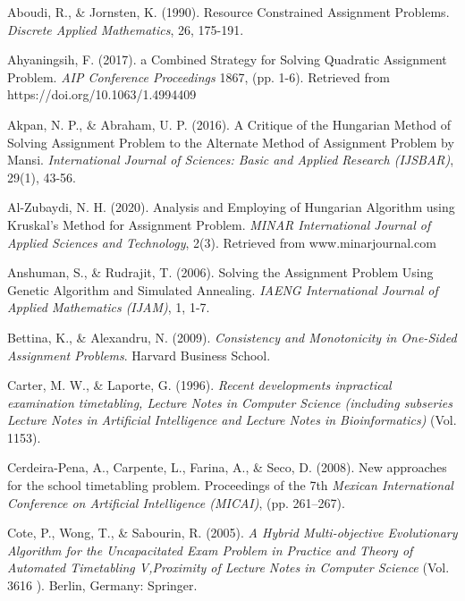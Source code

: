 \documentclass[11pt]{report}
\begin{document}
	\begin{description}
		\item Aboudi, R., \& Jornsten, K. (1990). Resource Constrained Assignment Problems. \emph{Discrete Applied Mathematics}, 26, 175-191.
		
		\item Ahyaningsih, F. (2017). a Combined Strategy for Solving Quadratic Assignment Problem. \emph{AIP
		Conference Proceedings} 1867, (pp. 1-6). Retrieved from https://doi.org/10.1063/1.4994409
		
		\item Akpan, N. P., \& Abraham, U. P. (2016). A Critique of the Hungarian Method of Solving
		Assignment Problem to the Alternate Method of Assignment Problem by Mansi. \emph{International Journal of Sciences: Basic and Applied Research (IJSBAR)}, 29(1), 43-56.
		
		\item Al-Zubaydi, N. H. (2020). Analysis and Employing of Hungarian Algorithm using Kruskal's
		Method for Assignment Problem. \emph{MINAR International Journal of Applied Sciences and
		Technology}, 2(3). Retrieved from www.minarjournal.com
		
		\item Anshuman, S., \& Rudrajit, T. (2006). Solving the Assignment Problem Using Genetic Algorithm
		and Simulated Annealing. \emph{IAENG International Journal of Applied Mathematics (IJAM)}, 1, 1-7.
		
		\item Bettina, K., \& Alexandru, N. (2009). \emph{Consistency and Monotonicity in One-Sided Assignment Problems}. Harvard Business School.
		
		\item Carter, M. W., \& Laporte, G. (1996). \emph{Recent developments inpractical examination timetabling, Lecture Notes in Computer Science (including subseries Lecture Notes in Artificial
		Intelligence and Lecture Notes in Bioinformatics)} (Vol. 1153).
		
		\item Cerdeira-Pena, A., Carpente, L., Farina, A., \& Seco, D. (2008). New approaches for the school
		timetabling problem. Proceedings of the 7th \emph{Mexican International Conference on Artificial Intelligence (MICAI)}, (pp. 261–267). 
		
		\item Cote, P., Wong, T., \& Sabourin, R. (2005). \emph{A Hybrid Multi-objective Evolutionary Algorithm for the Uncapacitated Exam Problem in Practice and Theory of Automated Timetabling V,Proximity of Lecture Notes in Computer Science} (Vol. 3616 ). Berlin, Germany: Springer.
		

\end{description}
\end{document}
